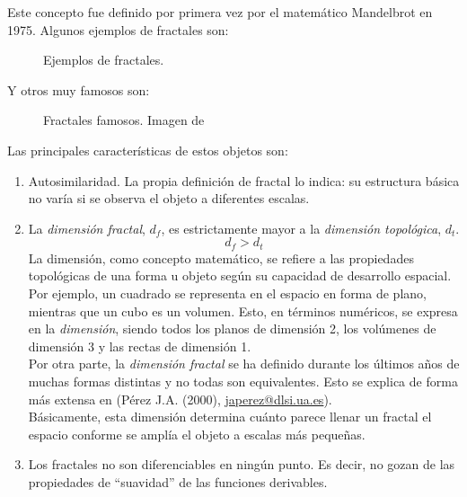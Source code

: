 \documentclass[a4paper, openright, 11pt, titlepage]{report}
\theoremstyle{definition}\newtheorem{defin}[propo]{Definition}
\theoremstyle{definition}\newtheorem{obser}[propo]{Remark}
\theoremstyle{definition}\newtheorem{ejem}[propo]{Ejemplo}
\theoremstyle{definition}\newtheorem{algoritmo}[propo]{Algoritmo}
\begin{document}
\begin{itemize}
    Este concepto fue definido por primera vez por el matemático Mandelbrot en 1975. Algunos ejemplos de fractales son:
    \begin{figure}[H]
        \centering
         \hspace{1.7cm}
        \caption{Ejemplos de fractales. \cite{ejemplosfrac}}
    \end{figure}
    Y otros muy famosos son:
    \begin{figure}[H]
        \centering
         \hspace{1.7cm}
        \caption{Fractales famosos. Imagen de \cite{triangulo}}
    \end{figure}
    Las principales características de estos objetos son:
    \begin{enumerate}
        \item Autosimilaridad. La propia definición de fractal lo indica: su estructura básica no varía si se observa el objeto a diferentes escalas.
        \item La \textit{dimensión fractal}, $d_{f}$, es estrictamente mayor a la \textit{dimensión topológica}, $d_{t}$.
        $$d_{f} > d_{t}$$
        La dimensión, como concepto matemático, se refiere a las propiedades topológicas de una forma u objeto según su capacidad de desarrollo espacial. Por ejemplo, un cuadrado se representa en el espacio en forma de plano, mientras que un cubo es un volumen. Esto, en términos numéricos, se expresa en la \textit{dimensión}, siendo todos los planos de dimensión 2, los volúmenes de dimensión 3 y las rectas de dimensión 1. \cite{dimension}\\
        Por otra parte, la \textit{dimensión fractal} se ha definido durante los últimos años de muchas formas distintas y no todas son equivalentes. Esto se explica de forma más extensa en \cite{fractales} ({Pérez J.A.} (2000), \url{japerez@dlsi.ua.es}).\\
        Básicamente, esta dimensión determina cuánto parece llenar un fractal el espacio conforme se amplía el objeto a escalas más pequeñas.
        \item Los fractales no son diferenciables en ningún punto. Es decir, no gozan de las propiedades de “suavidad” de las funciones derivables.\\

\end{enumerate}
\end{itemize}
\end{document}
